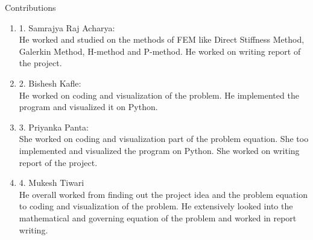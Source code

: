 \documentclass[a4paper,15pt]{article}
\begin{document}
	Contributions \\
	\begin{enumerate}
		\item 	1. Samrajya Raj Acharya:\\
		 He worked and studied on the methods of FEM like Direct Stiffness Method, Galerkin Method, H-method and P-method. He worked on writing report of the project.\\
		 \item  2. Bishesh Kafle:\\
		 He worked on coding and visualization of the problem. He implemented the program and visualized it on Python.\\
		 \item 3. Priyanka Panta:\\
		 She worked on coding and visualization part of the problem equation. She too implemented and visualized the program on Python. She worked on writing report of the project. \\
		 \item 4. Mukesh Tiwari\\
		 He overall worked from finding out the project idea and the problem equation to coding and visualization of the problem. He extensively looked into the mathematical and governing equation of the problem and worked in report writing.
	\end{enumerate}
\end{document}
